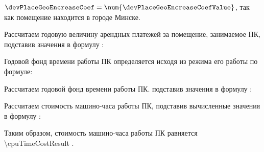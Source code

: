 \(\devPlaceGeoEncreaseCoef = \num{\devPlaceGeoEncreaseCoefValue}\), так как помещение находится в городе Минске.

Рассчитаем годовую величину арендных платежей за помещение, занимаемое ПК, подставив значения в формулу :
\devPlaceRentCostFormulaApplied

Годовой фонд времени работы ПК определяется исходя из режима его работы по формуле:
\pcWorkabilityFundEquation

Рассчитаем годовой фонд времени работы ПК. подставив значения в формулу :
\pcWorkabilityFundFormulaApplied

Рассчитаем стоимость машино-часа работы ПК, подставив вычисленные значения в формулу :
\pcPcHourCostFormulaApplied

Таким образом, стоимость машино-часа работы ПК равняется \num{\cpuTimeCostResult} \ye.